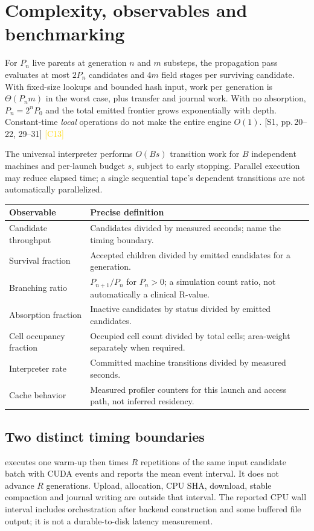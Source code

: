 \documentclass[11pt,a4paper]{article}
\newcommand{\src}[2]{\textcolor{muted}{[#1, #2]}}
\newcommand{\corr}[1]{\textcolor{gold}{\textsf{[#1]}}}
\newcommand{\code}[1]{\texttt{\detokenize{#1}}}
\begin{document}
\section{Complexity, observables and benchmarking}
For $P_n$ live parents at generation $n$ and $m$ substeps, the propagation pass evaluates at most $2P_n$ candidates and $4m$ field stages per surviving candidate. With fixed-size lookups and bounded hash input, work per generation is $\Theta(P_n m)$ in the worst case, plus transfer and journal work. With no absorption, $P_n=2^nP_0$ and the total emitted frontier grows exponentially with depth. Constant-time \emph{local} operations do not make the entire engine $O(1)$. \src{S1}{pp.\,20--22, 29--31} \corr{C13}

The universal interpreter performs $O(Bs)$ transition work for $B$ independent machines and per-launch budget $s$, subject to early stopping. Parallel execution may reduce elapsed time; a single sequential tape's dependent transitions are not automatically parallelized.

\small
\begin{tabularx}{\textwidth}{@{}P{42mm}Y@{}}\toprule
\textbf{Observable} & \textbf{Precise definition}\\\midrule
Candidate throughput & Candidates divided by measured seconds; name the timing boundary.\\
Survival fraction & Accepted children divided by emitted candidates for a generation.\\
Branching ratio & $P_{n+1}/P_n$ for $P_n>0$; a simulation count ratio, not automatically a clinical R-value.\\
Absorption fraction & Inactive candidates by status divided by emitted candidates.\\
Cell occupancy fraction & Occupied cell count divided by total cells; area-weight separately when required.\\
Interpreter rate & Committed machine transitions divided by measured seconds.\\
Cache behavior & Measured profiler counters for this launch and access path, not inferred residency.\\\bottomrule
\end{tabularx}\normalsize

\subsection{Two distinct timing boundaries}
\code{--repeats R} executes one warm-up then times $R$ repetitions of the same input candidate batch with CUDA events and reports the mean event interval. It does not advance $R$ generations. Upload, allocation, CPU SHA, download, stable compaction and journal writing are outside that interval. The reported CPU wall interval includes orchestration after backend construction and some buffered file output; it is not a durable-to-disk latency measurement.
\end{document}
